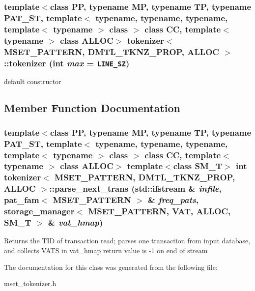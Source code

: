\subsubsection{\setlength{\rightskip}{0pt plus 5cm}template$<$class PP, typename MP, typename TP, typename PAT\_\-ST, template$<$ typename, typename, typename, template$<$ typename $>$ class $>$ class CC, template$<$ typename $>$ class ALLOC$>$ \bf{tokenizer}$<$ MSET\_\-PATTERN, DMTL\_\-TKNZ\_\-PROP, ALLOC $>$::\bf{tokenizer} (int {\em max} = {\tt LINE\_\-SZ})\hspace{0.3cm}{\tt  [inline]}}\label{classtokenizer_3_01MSET__PATTERN_00_01DMTL__TKNZ__PROP_00_01ALLOC_01_4_34a28f77388a57a5f724a24275ba0de6}


default constructor 

\subsection{Member Function Documentation}
\subsubsection{\setlength{\rightskip}{0pt plus 5cm}template$<$class PP, typename MP, typename TP, typename PAT\_\-ST, template$<$ typename, typename, typename, template$<$ typename $>$ class $>$ class CC, template$<$ typename $>$ class ALLOC$>$ template$<$class SM\_\-T$>$ int \bf{tokenizer}$<$ MSET\_\-PATTERN, DMTL\_\-TKNZ\_\-PROP, ALLOC $>$::parse\_\-next\_\-trans (std::ifstream \& {\em infile}, \bf{pat\_\-fam}$<$ MSET\_\-PATTERN $>$ \& {\em freq\_\-pats}, \bf{storage\_\-manager}$<$ MSET\_\-PATTERN, \bf{VAT}, ALLOC, SM\_\-T $>$ \& {\em vat\_\-hmap})\hspace{0.3cm}{\tt  [inline]}}\label{classtokenizer_3_01MSET__PATTERN_00_01DMTL__TKNZ__PROP_00_01ALLOC_01_4_c8904090f794055e42794835207bf180}


Returns the TID of transaction read; parses one transaction from input database, and collects VATS in vat\_\-hmap return value is -1 on end of stream 

The documentation for this class was generated from the following file:\begin{CompactItemize}
\item 
mset\_\-tokenizer.h\end{CompactItemize}
